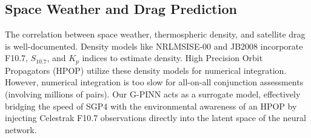 \subsection{Space Weather and Drag Prediction}
The correlation between space weather, thermospheric density, and satellite drag is well-documented. Density models like NRLMSISE-00 and JB2008 incorporate F10.7, $S_{10.7}$, and $K_p$ indices to estimate density. High Precision Orbit Propagators (HPOP) utilize these density models for numerical integration. However, numerical integration is too slow for all-on-all conjunction assessments (involving millions of pairs). Our G-PINN acts as a surrogate model, effectively bridging the speed of SGP4 with the environmental awareness of an HPOP by injecting Celestrak F10.7 observations directly into the latent space of the neural network.
